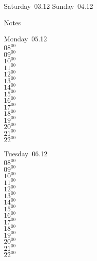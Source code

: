 \documentclass[11pt,a4paper]{book}\usepackage[]{graphicx}\usepackage[]{color}
\begin{document}
\begin{weekendbox}
  Saturday~03.12
  \tcblower
  Sunday~04.12
\end{weekendbox} %
\begin{notebox}
  Notes
\end{notebox}
\clearpage
\begin{headerbox}
\end{headerbox}
\begin{weekdaybox}
  Monday~05.12\\
  { 
  \vfill
  $08^{00}$\\
$09^{00}$\\
$10^{00}$\\
$11^{00}$\\
$12^{00}$\\
$13^{00}$\\
$14^{00}$\\
$15^{00}$\\
$16^{00}$\\
$17^{00}$\\
$18^{00}$\\
$19^{00}$\\
$20^{00}$\\
$21^{00}$\\
$22^{00}$\\
  }
\end{weekdaybox}
\begin{weekdaybox}
  Tuesday~06.12\\
  { 
  \vfill
  $08^{00}$\\
$09^{00}$\\
$10^{00}$\\
$11^{00}$\\
$12^{00}$\\
$13^{00}$\\
$14^{00}$\\
$15^{00}$\\
$16^{00}$\\
$17^{00}$\\
$18^{00}$\\
$19^{00}$\\
$20^{00}$\\
$21^{00}$\\
$22^{00}$\\
  }
\end{weekdaybox}
\end{document}
